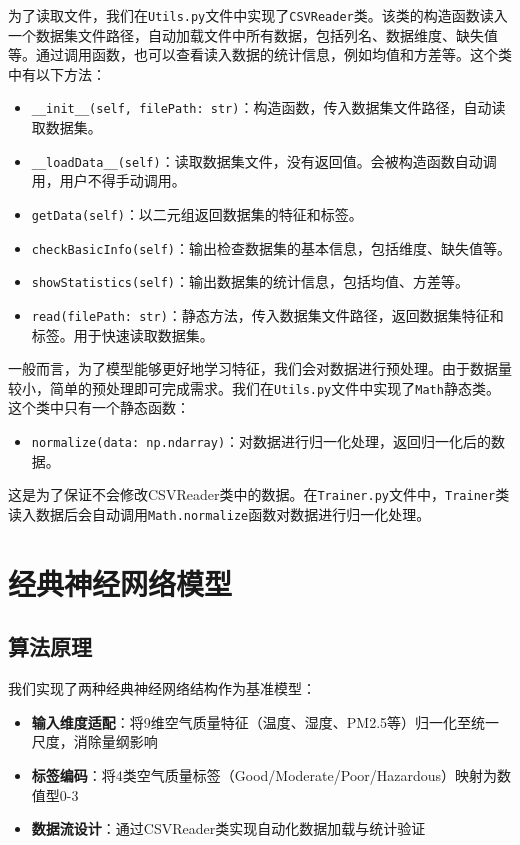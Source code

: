 \documentclass[10pt,a4paper,twoside]{article}
\numberwithin{figure}{section}%
\numberwithin{table}{section}%
\begin{document}
为了读取文件，我们在\texttt{Utils.py}文件中实现了\texttt{CSVReader}类。该类的构造函数读入一个数据集文件路径，自动加载文件中所有数据，包括列名、数据维度、缺失值等。通过调用函数，也可以查看读入数据的统计信息，例如均值和方差等。这个类中有以下方法：

\begin{itemize}
	\item \texttt{\_\_init\_\_(self, filePath: str)}：构造函数，传入数据集文件路径，自动读取数据集。
	\item \texttt{\_\_loadData\_\_(self)}：读取数据集文件，没有返回值。会被构造函数自动调用，用户不得手动调用。
	\item \texttt{getData(self)}：以二元组返回数据集的特征和标签。
	\item \texttt{checkBasicInfo(self)}：输出检查数据集的基本信息，包括维度、缺失值等。
	\item \texttt{showStatistics(self)}：输出数据集的统计信息，包括均值、方差等。
	\item \texttt{read(filePath: str)}：静态方法，传入数据集文件路径，返回数据集特征和标签。用于快速读取数据集。
\end{itemize}

一般而言，为了模型能够更好地学习特征，我们会对数据进行预处理。由于数据量较小，简单的预处理即可完成需求。我们在\texttt{Utils.py}文件中实现了\texttt{Math}静态类。这个类中只有一个静态函数：

\begin{itemize}
	\item \texttt{normalize(data: np.ndarray)}：对数据进行归一化处理，返回归一化后的数据。
\end{itemize}

这是为了保证不会修改CSVReader类中的数据。在\texttt{Trainer.py}文件中，\texttt{Trainer}类读入数据后会自动调用\texttt{Math.normalize}函数对数据进行归一化处理。


\section{经典神经网络模型}

\subsection{算法原理}
我们实现了两种经典神经网络结构作为基准模型：
\begin{itemize}
\item \textbf{输入维度适配}：将9维空气质量特征（温度、湿度、PM2.5等）归一化至统一尺度，消除量纲影响

\item \textbf{标签编码}：将4类空气质量标签（Good/Moderate/Poor/Hazardous）映射为数值型0-3

\item \textbf{数据流设计}：通过CSVReader类实现自动化数据加载与统计验证
\end{itemize}
\end{document}
